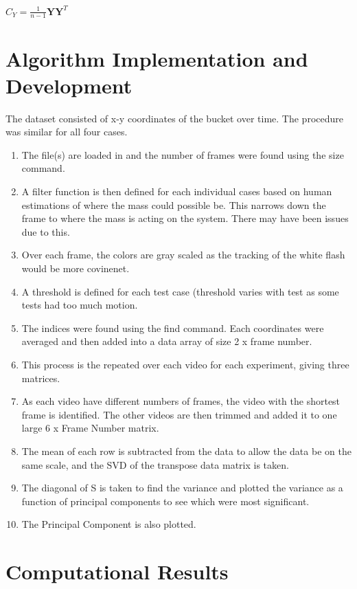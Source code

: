\documentclass[a4paper,12pt]{article}
\begin{document}
$C_Y = \frac { 1 } { n - 1 } \mathbf { Y } \mathbf { Y } ^ { T }$








\section{Algorithm Implementation and Development}
The dataset consisted of x-y coordinates of the bucket over time. The procedure was similar for all four cases. 
\begin{enumerate}
\item The file(s) are loaded in and the number of frames were found using the size command.
\item A filter function is then defined for each individual cases based on human estimations of where the mass could possible be. This narrows down the frame to where the mass is acting on the system. There may have been issues due to this.
\item Over each frame, the colors are gray scaled as the tracking of the white flash would be more covinenet.
\item A threshold is defined for each test case (threshold varies with test as some tests had too much motion.
\item The indices were found using the find command. Each coordinates were averaged and then added into a data array of size 2 x frame number. 
\item This process is the repeated over each video for each experiment, giving three matrices.
\item As each video have different numbers of frames, the video with the shortest frame is identified. The other videos are then trimmed and added it to one large 6 x Frame Number matrix. 
\item The mean of each row is subtracted from the data to allow the data be on the same scale, and the SVD of the transpose data matrix is taken.
\item The diagonal of S is taken to find the variance and plotted the variance as a function of principal components to see which were most significant.
\item The Principal Component is also plotted.
\end{enumerate}

\section{Computational Results}
\end{document}
